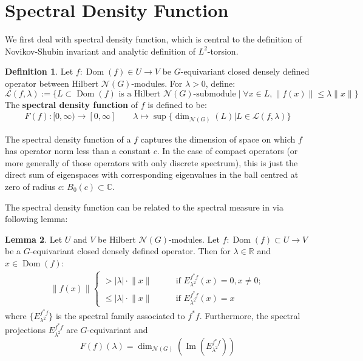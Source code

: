 \documentclass[11pt]{report}
\theoremstyle{definition}
\newtheorem{Def}{Definition}[chapter]
\newtheorem{Lemma}[Def]{Lemma}
\theoremstyle{plain}
\DeclareMathOperator{\im}{Im}
\DeclareMathOperator{\dom}{Dom}
\newcommand{\real}{\mathbb{R}}
\newcommand{\complex}{\mathbb{C}}
\newcommand{\vna}{\mathcal{N}}
\newcommand{\norm}[1]{\lVert #1 \rVert}
\begin{document}
\section{Spectral Density Function}
We first deal with spectral density function, which is central to the definition of Novikov-Shubin invariant and analytic definition of $L^2$-torsion.
\begin{Def}\label{2.1}
	Let $f:\dom(f)\in U\to V$ be $G$-equivariant closed densely defined operator between Hilbert $\vna(G)$-modules. For $\lambda>0$, define:\begin{equation*}
	\mathcal{L}(f,\lambda):=\{L\subset \dom(f)  \text{ is a Hilbert }\vna(G)\text{-submodule} \mid \forall x\in L, \norm{f(x)}\leq \lambda \norm{x}\}
	\end{equation*}
	The \textbf{spectral density function} of $f$ is defined to be:
	\begin{align*}
	F(f):[0, \infty)\longrightarrow[0, \infty] \qquad \lambda \mapsto \sup\{\dim_{\vna(G)}(L)|L\in \mathcal{L}(f,\lambda)\}
	\end{align*}
\end{Def}
The spectral density function of a $f$ captures the dimension of space on which $f$ has operator norm less than a constant $c$. In the case of compact operators (or more generally of those operators with only discrete spectrum), this is just the direct sum of eigenspaces with corresponding eigenvalues in the ball centred at zero of radius $c$: $B_0(c)\subset \complex$. 
\par The spectral density function can be related to the spectral measure in  via following lemma:
\begin{Lemma}\label{2.3}
	Let $U$ and $V$ be Hilbert $\vna(G)$-modules. Let $f:\dom(f)\subset U\to V$ be a $G$-equivariant closed densely defined operator. Then for $\lambda\in \real$ and $x\in \dom(f)$:
	\begin{align*}
	\norm{f(x)}\begin{cases}
	>|\lambda|\cdot\norm{x}\qquad &\text{if } E_{\lambda^2}^{f^*f}(x)=0, x\neq 0;\\
	\leq |\lambda|\cdot \norm{x}\qquad & \text{if } E_{\lambda^2}^{f^*f}(x)=x
	\end{cases}
	\end{align*}
	where $\{E_{\lambda^2}^{f^*f}\}$ is the spectral family associated to $f^*f$. Furthermore, the spectral projections $E_{\lambda^2}^{f^*f}$ are $G$-equivariant and
	\begin{equation}
	F(f)(\lambda)=\dim_{\vna(G)}(\im (E_{\lambda^2}^{f^*f}))
	\end{equation}
\end{Lemma}
\end{document}
